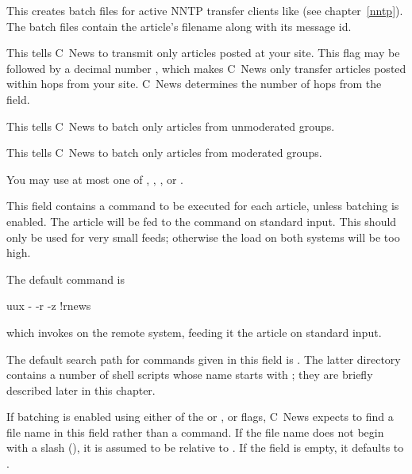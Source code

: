 \documentclass[11pt,makeidx]{report}
\begin{document}
{\begin{dispitems}
\begin{dispitems}
	\ditem[\keyword{n}]
		This creates batch files for active NNTP transfer
		clients like  (see chapter~\ref{nntp}).
		The batch files contain the article's filename along
		with its message id.

	\ditem[\keyword{L}]
		This tells C~News to transmit only articles posted at your
		site. This flag may be followed by a decimal number
		, which makes C~News only transfer articles
		posted within  hops from your site. C~News
		determines the number of hops from the  field.

	\ditem[\keyword{u}]
		This tells C~News to batch only articles from unmoderated
		groups. 

	\ditem[\keyword{m}]
		This tells C~News to batch only articles from moderated
		groups. 
	\end{dispitems}

	You may use at most one of , ,
	, or .

	This field contains a command to be executed for each article,
	unless batching is enabled. The article will be fed to the
	command on standard input. This should only be used for very
	small feeds; otherwise the load on both systems will be too high.


	The default command is

	\begin{tscreen}
	 uux - -r -z \/!rnews
	\end{tscreen}

	\noindent
	which invokes  on the remote system, feeding it
	the article on standard input.


	The default search path for commands given in this field is
	. The latter directory
	contains a number of shell scripts whose name starts with
	; they are briefly described later in this chapter.


	If batching is enabled using either of the  or
	,  or  flags, C~News expects to
	find a file name in this field rather than a command. If the
	file name does not begin with a slash (\file{/}), it is assumed
	to be relative to . If the field is
	empty, it defaults to .


\end{dispitems}
}
\end{document}
